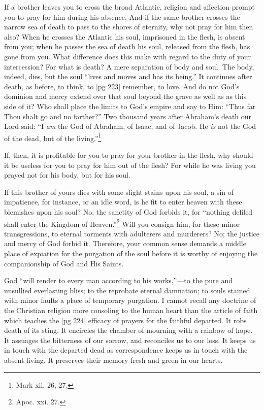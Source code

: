 If a brother leaves you to cross the broad Atlantic,
religion and affection prompt you to pray
for him during his absence. And if the same
brother crosses the narrow sea of death to pass
to the shores of eternity, why not pray for him
then also? When he crosses the Atlantic his soul,
imprisoned in the flesh, is absent from you; when
he passes the sea of death his soul, released from
the flesh, has gone from you. What difference
does this make with regard to the duty of your
intercession? For what is death? A mere separation
of body and soul. The body, indeed, dies,
but the soul “lives and moves and has its being.”
It continues after death, as before, to think, to
[pg 223]
remember, to love. And do not God's dominion
and mercy extend over that soul beyond the grave
as well as as this side of it? Who shall place
the limits to God's empire and say to Him:
“Thus far Thou shalt go and no farther?” Two
thousand years after Abraham's death our Lord
said: “I \emph{am} the God of Abraham, of Isaac, and
of Jacob. He \emph{is} not the God of the dead, but of
the living.”\footnote{Mark xii. 26, 27.}

If, then, it is profitable for you to pray for
your brother in the flesh, why should it be useless
for you to pray for him out of the flesh? For
while he was living you prayed not for his body,
but for his soul.

If this brother of yours dies with some slight
stains upon his soul, a sin of impatience, for instance,
or an idle word, is he fit to enter heaven
with these blemishes upon his soul? No; the sanctity
of God forbids it, for “nothing defiled shall
enter the Kingdom of Heaven.”\footnote{Apoc.
xxi. 27.} Will you consign
him, for these minor transgressions, to eternal
torments with adulterers and murderers? No;
the justice and mercy of God forbid it. Therefore,
your common sense demands a middle place
of expiation for the purgation of the soul before
it is worthy of enjoying the companionship of God
and His Saints.

God “will render to every man according to his
works,”—to the pure and unsullied everlasting
bliss; to the reprobate eternal damnation; to souls
stained with minor faults a place of temporary
purgation. I cannot recall any doctrine of the
Christian religion more consoling to the human
heart than the article of faith which teaches the
[pg 224]
efficacy of prayers for the faithful departed. It
robs death of its sting. It encircles the chamber
of mourning with a rainbow of hope. It assuages
the bitterness of our sorrow, and reconciles us to
our loss. It keeps us in touch with the departed
dead as correspondence keeps us in touch with the
absent living. It preserves their memory fresh and
green in our hearts.

